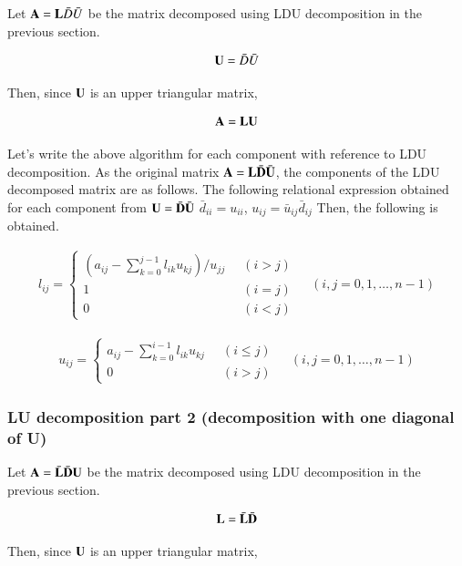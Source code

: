 Let $\mathbf{A}=\mathbf{L}\bar{D}\bar{U}$ be the matrix decomposed using LDU decomposition in the previous section.

\begin{equation}
\mathbf{U} = \bar{D}\bar{U}
\end{equation}

Then, since $\mathbf{U}$ is an upper triangular matrix,

\begin{equation}
\mathbf{A} = \mathbf{L}\mathbf{U}
\end{equation}

Let's write the above algorithm for each component with reference to LDU decomposition. As the original matrix $\mathbf{A}=\mathbf{L}\bar{\mathbf{D}}\bar{\mathbf{U}}$, the components of the LDU decomposed matrix are as follows. The following relational expression obtained for each component from $\mathbf{U} = \bar{\mathbf{D}}\bar{\mathbf{U}}$
$\bar{d}_{ii} = u_{ii}$, $u_{ij} = \bar{u}_{ij}\bar{d}_{ij}$
Then, the following is obtained.

\begin{eqnarray}
l_{ij} = \left\{\begin{array}{ll}
\left(a_{ij} - \sum_{k=0}^{j-1} l_{ik} u_{kj}\right)/u_{jj}\;\; &  (i>j)\\
1 &(i=j)\\
0 & (i<j)
\end{array}\right.\;\;\;\; (i,j=0,1,\ldots,n-1)
\end{eqnarray}


\begin{eqnarray}
u_{ij} = \left\{\begin{array}{ll}
a_{ij} - \sum_{k=0}^{i-1} l_{ik} u_{kj}\;\; & (i\le j)\\
0 & (i>j)\end{array}\right.\;\;\;\; (i,j=0,1,\ldots,n-1)
\end{eqnarray}


\subsubsection{LU decomposition part 2 (decomposition with one diagonal of U)}

Let $\mathbf{A}=\bar{\mathbf{L}}\bar{\mathbf{D}}\mathbf{\mathbf{U}}$ be the matrix decomposed using LDU decomposition in the previous section.

\begin{equation}
\mathbf{L} = \bar{\mathbf{L}}\bar{\mathbf{D}}
\end{equation}

Then, since $\mathbf{U}$ is an upper triangular matrix,

